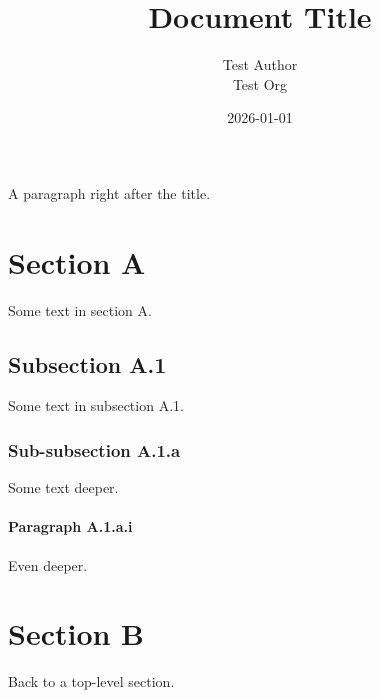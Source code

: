 \documentclass[11pt,a4paper]{article}
\title{Document Title}
\author{Test Author \\ Test Org}
\date{2026-01-01}
\theoremstyle{definition}
\begin{document}
\maketitle

A paragraph right after the title.


\section{Section A}

Some text in section A.


\subsection{Subsection A.1}

Some text in subsection A.1.


\subsubsection{Sub-subsection A.1.a}

Some text deeper.


\paragraph{Paragraph A.1.a.i}

Even deeper.


\section{Section B}

Back to a top-level section.
\end{document}
